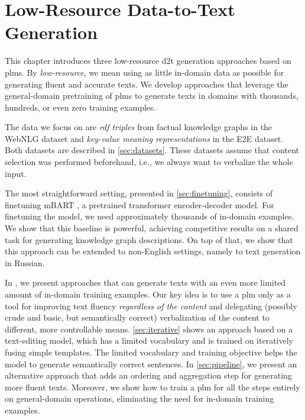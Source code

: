\chapter{Low-Resource Data-to-Text Generation}
\label{chap:low-res}

This chapter introduces three low-resource \ac{d2t} generation approaches based on \acp{plm}. By \emph{low-resource}, we mean using as little in-domain data as possible for generating fluent and accurate texts. We develop approaches that leverage the general-domain pretraining of \acp{plm} to generate texts in domains with thousands, hundreds, or even zero training examples.

The data we focus on are \emph{\acs{rdf} triples} from factual knowledge graphs in the WebNLG dataset and \emph{key-value meaning representations} in the E2E dataset. Both datasets are described in \autoref{sec:datasets}. These datasets assume that content selection was performed beforehand, i.e., we always want to verbalize the whole input.

The most straightforward setting, presented in \autoref{sec:finetuning}, consists of finetuning mBART \cite{liuMultilingualDenoisingPretraining2020}, a pretrained transformer encoder-decoder model. For finetuning the model, we need approximately thousands of in-domain examples. We show that this baseline is powerful, achieving competitive results on a shared task for generating knowledge graph descriptions. On top of that, we show that this approach can be extended to non-English settings, namely to text generation in Russian.

In , we present approaches that can generate texts with an even more limited amount of in-domain training examples. Our key idea is to use a \ac{plm} only as a tool for improving text fluency \emph{regardless of the content} and delegating (possibly crude and basic, but semantically correct) verbalization of the content to different, more controllable means. \autoref{sec:iterative} shows an approach based on a text-editing model, which has a limited vocabulary and is trained on iteratively fusing simple templates. The limited vocabulary and training objective helps the model to generate semantically correct sentences. In \autoref{sec:pipeline}, we present an alternative approach that adds an ordering and aggregation step for generating more fluent texts. Moreover, we show how to train a \ac{plm} for all the steps entirely on general-domain operations, eliminating the need for in-domain training examples.

